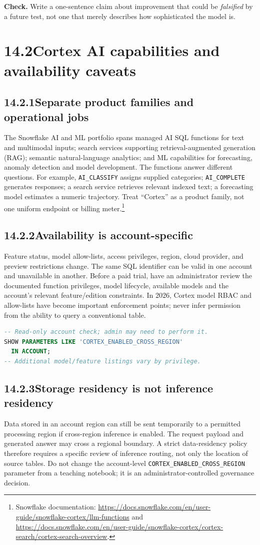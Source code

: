 \documentclass[11pt,twoside]{article}
\newcommand{\topic}[2]{\subsection*{#1\quad #2}}
\begin{document}
\textbf{Check.} Write a one-sentence claim about improvement that could be \emph{falsified} by a future test, not one that merely describes how sophisticated the model is.

\newpage

\section*{14.2\quad Cortex AI capabilities and availability caveats}
\topic{14.2.1}{Separate product families and operational jobs}
The Snowflake AI and ML portfolio spans managed AI SQL functions for text and multimodal inputs; search services supporting retrieval-augmented generation (RAG); semantic natural-language analytics; and ML capabilities for forecasting, anomaly detection and model development. The functions answer different questions. For example, \texttt{AI\_CLASSIFY} assigns supplied categories; \texttt{AI\_COMPLETE} generates responses; a search service retrieves relevant indexed text; a forecasting model estimates a numeric trajectory. Treat ``Cortex'' as a product family, not one uniform endpoint or billing meter.\footnote{Snowflake documentation: \url{https://docs.snowflake.com/en/user-guide/snowflake-cortex/llm-functions} and \url{https://docs.snowflake.com/en/user-guide/snowflake-cortex/cortex-search/cortex-search-overview}.}
\topic{14.2.2}{Availability is account-specific}
Feature status, model allow-lists, access privileges, region, cloud provider, and preview restrictions change. The same SQL identifier can be valid in one account and unavailable in another. Before a paid trial, have an administrator review the documented function privileges, model lifecycle, available models and the account's relevant feature/edition constraints. In 2026, Cortex model RBAC and allow-lists have become important enforcement points; never infer permission from the ability to query a conventional table.
\begin{lstlisting}[language=SQL]
-- Read-only account check; admin may need to perform it.
SHOW PARAMETERS LIKE 'CORTEX_ENABLED_CROSS_REGION'
  IN ACCOUNT;
-- Additional model/feature listings vary by privilege.
\end{lstlisting}
\topic{14.2.3}{Storage residency is not inference residency}
Data stored in an account region can still be sent temporarily to a permitted processing region if cross-region inference is enabled. The request payload and generated answer may cross a regional boundary. A strict data-residency policy therefore requires a specific review of inference routing, not only the location of source tables. Do not change the account-level \texttt{CORTEX\_ENABLED\_CROSS\_REGION} parameter from a teaching notebook; it is an administrator-controlled governance decision.
\end{document}
